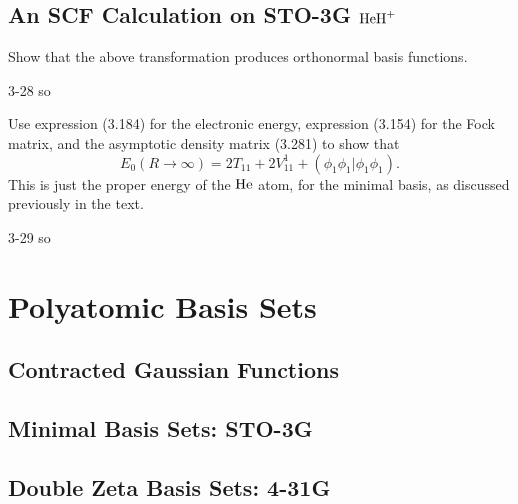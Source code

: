 \documentclass[a4paper]{book}
\begin{document}
	\subsection{An SCF Calculation on STO-3G \texorpdfstring{$\ce{HeH+}$}-}
	
	\begin{exercise}
	Show that the above transformation produces orthonormal basis functions.
	\end{exercise}
	
	\begin{solution}
		3-28 so
	\end{solution}
	
	\begin{exercise}
	Use expression (3.184) for the electronic energy, expression (3.154) for the Fock matrix, and the asymptotic density matrix (3.281) to show that
	\[
		E_0( R \rightarrow \infty ) = 2 T_{11} + 2 V^1_{11} + ( \phi_1 \phi_1 | \phi_1 \phi_1 ).
	\]
	This is just the proper energy of the $\ce{He}$ atom, for the minimal basis, as discussed previously in the text.
	\end{exercise}
	
	\begin{solution}
		3-29 so
	\end{solution}
	
	\section{Polyatomic Basis Sets}
	
	\subsection{Contracted Gaussian Functions}
	
	\subsection{Minimal Basis Sets: STO-3G}
	
	\subsection{Double Zeta Basis Sets: 4-31G}
	
\end{document}
